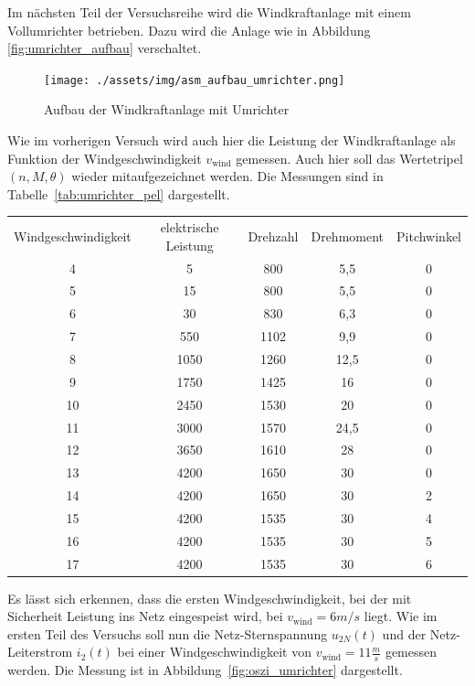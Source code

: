 \documentclass{report}
\begin{document}
Im nächsten Teil der Versuchsreihe wird die Windkraftanlage mit einem Vollumrichter betrieben. Dazu wird die Anlage wie in Abbildung \ref{fig:umrichter_aufbau} verschaltet.


\begin{figure}[!ht]
  \centering
  \texttt{[image: ./assets/img/asm\_aufbau\_umrichter.png]}
  \caption{Aufbau der Windkraftanlage mit Umrichter}
  \label{fig:aufbau_umrichter}
\end{figure}

Wie im vorherigen Versuch wird auch hier die Leistung der Windkraftanlage als Funktion der Windgeschwindigkeit $v_{\mathrm{wind}}$ gemessen. Auch hier soll das Wertetripel $(n, M, \theta)$ wieder mitaufgezeichnet werden. Die Messungen sind in Tabelle~\ref{tab:umrichter_pel} dargestellt.

\begin{table}[!ht]
\begin{tabular}{|c|c|c|c|c|}
Windgeschwindigkeit & elektrische Leistung & Drehzahl & Drehmoment & Pitchwinkel \\
4                   & 5                   & 800      & 5,5        & 0           \\
5                   & 15                   & 800      & 5,5        & 0           \\
6                   & 30                   & 830      & 6,3        & 0           \\
7                   & 550                  & 1102     & 9,9        & 0           \\
8                   & 1050                 & 1260     & 12,5       & 0           \\
9                   & 1750                 & 1425     & 16         & 0           \\
10                  & 2450                 & 1530     & 20         & 0           \\
11                  & 3000                 & 1570     & 24,5       & 0           \\
12                  & 3650                 & 1610     & 28         & 0           \\
13                  & 4200                 & 1650     & 30         & 0           \\
14                  & 4200                 & 1650     & 30         & 2           \\
15                  & 4200                 & 1535     & 30         & 4           \\
16                  & 4200                 & 1535     & 30         & 5           \\
17                  & 4200                 & 1535     & 30         & 6
\end{tabular}
\end{table}
Es lässt sich erkennen, dass die ersten Windgeschwindigkeit, bei der mit Sicherheit Leistung ins Netz eingespeist wird, bei $v_{\mathrm{wind}} = 6m/s$ liegt.
Wie im ersten Teil des Versuchs soll nun die Netz-Sternspannung $u_{2N}(t)$ und der Netz-Leiterstrom $i_{2}(t)$ bei einer Windgeschwindigkeit von $v_{\mathrm{wind}} = 11 \frac{m}{s}$ gemessen werden. Die Messung ist in Abbildung~\ref{fig:oszi_umrichter} dargestellt.
\end{document}
